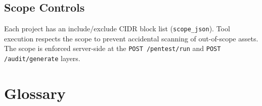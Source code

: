 \documentclass[11pt,a4paper,twoside,openright]{book}
\begin{document}
\section{Scope Controls}

Each project has an include/exclude CIDR block list (\texttt{scope\_json}). Tool execution respects the scope to prevent accidental scanning of out-of-scope assets. The scope is enforced server-side at the \texttt{POST /pentest/run} and \texttt{POST /audit/generate} layers.

\backmatter
\chapter*{Glossary}
\end{document}
